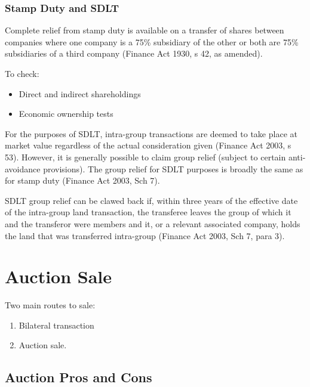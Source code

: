 \documentclass[
]{article}
\providecommand{\tightlist}{%
  \setlength{\itemsep}{0pt}\setlength{\parskip}{0pt}}
\begin{document}
\hypertarget{stamp-duty-and-sdlt}{%
\subsubsection{Stamp Duty and SDLT}\label{stamp-duty-and-sdlt}}

Complete relief from stamp duty is available on a transfer of shares
between companies where one company is a 75\% subsidiary of the other or
both are 75\% subsidiaries of a third company (Finance Act 1930, s 42,
as amended).

To check:

\begin{itemize}
\tightlist
\item
  Direct and indirect shareholdings
\item
  Economic ownership tests
\end{itemize}

For the purposes of SDLT, intra-group transactions are deemed to take
place at market value regardless of the actual consideration given
(Finance Act 2003, s 53). However, it is generally possible to claim
group relief (subject to certain anti-avoidance provisions). The group
relief for SDLT purposes is broadly the same as for stamp duty (Finance
Act 2003, Sch 7).

SDLT group relief can be clawed back if, within three years of the
effective date of the intra-group land transaction, the transferee
leaves the group of which it and the transferor were members and it, or
a relevant associated company, holds the land that was transferred
intra-group (Finance Act 2003, Sch 7, para 3).

\hypertarget{auction-sale}{%
\section{Auction Sale}\label{auction-sale}}

Two main routes to sale:

\begin{enumerate}
\def\labelenumi{\arabic{enumi}.}
\tightlist
\item
  Bilateral transaction
\item
  Auction sale.
\end{enumerate}

\hypertarget{auction-pros-and-cons}{%
\subsection{Auction Pros and Cons}\label{auction-pros-and-cons}}
\end{document}
